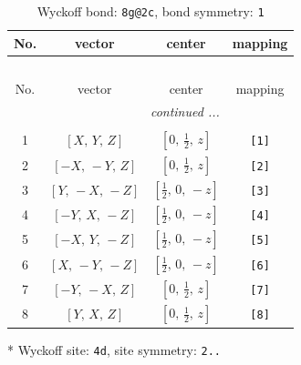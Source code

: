 \documentclass[fleqn,8pt]{jsarticle}
\begin{document}
\begin{longtable}{cccc}
\caption{Wyckoff bond: {\tt 8g@2c}, bond symmetry: {\tt 1}}
 \\
 \hline \hline
No. & vector & center & mapping \\ \hline \endfirsthead

\multicolumn{3}{l}{\tablename\ \thetable{}} \\
 \hline \hline
No. & vector & center & mapping \\ \hline \endhead

 \hline \hline
\multicolumn{3}{r}{\footnotesize\it continued ...} \\ \endfoot

 \hline \hline
\multicolumn{3}{r}{} \\ \endlastfoot

1 & $\left[ X,\, Y,\, Z \right]$ & $\left[ 0,\, \frac{1}{2},\, z \right]$ & {\tt [1]} \\ \hline
2 & $\left[ - X,\, - Y,\, Z \right]$ & $\left[ 0,\, \frac{1}{2},\, z \right]$ & {\tt [2]} \\ \hline
3 & $\left[ Y,\, - X,\, - Z \right]$ & $\left[ \frac{1}{2},\, 0,\, - z \right]$ & {\tt [3]} \\ \hline
4 & $\left[ - Y,\, X,\, - Z \right]$ & $\left[ \frac{1}{2},\, 0,\, - z \right]$ & {\tt [4]} \\ \hline
5 & $\left[ - X,\, Y,\, - Z \right]$ & $\left[ \frac{1}{2},\, 0,\, - z \right]$ & {\tt [5]} \\ \hline
6 & $\left[ X,\, - Y,\, - Z \right]$ & $\left[ \frac{1}{2},\, 0,\, - z \right]$ & {\tt [6]} \\ \hline
7 & $\left[ - Y,\, - X,\, Z \right]$ & $\left[ 0,\, \frac{1}{2},\, z \right]$ & {\tt [7]} \\ \hline
8 & $\left[ Y,\, X,\, Z \right]$ & $\left[ 0,\, \frac{1}{2},\, z \right]$ & {\tt [8]} \\
\end{longtable}
* Wyckoff site: {\tt 4d}, site symmetry: {\tt 2..}
\renewcommand{\arraystretch}{1.2}
\end{document}
